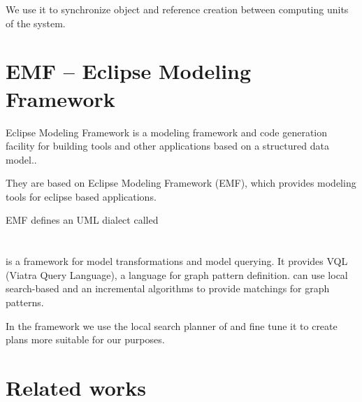 We use it to synchronize object and reference creation between computing units of the system.


\section{EMF -- Eclipse Modeling Framework}

Eclipse Modeling Framework is a modeling framework and code generation facility for building tools and other applications based on a structured data model.\cite{emf}.



They are based on Eclipse Modeling Framework (EMF), which provides modeling tools for eclipse based applications.

EMF defines an UML dialect called


\section{\protect\viatra{} }


\viatra{} \cite{viatra} is a framework for model transformations and model querying. 
It provides VQL (Viatra Query Language), a language for graph pattern definition.
\viatra{} can use local search-based and an incremental algorithms to provide matchings for graph patterns. 

In the framework we use the local search planner of \viatra{} and fine tune it to create plans more suitable for our purposes.


\section{Related works}






